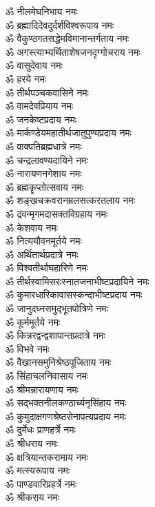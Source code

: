 \begin{multicols}{2}
\begin{flushleft}
ॐ नीलमेघनिभाय नमः\\
ॐ ब्रह्मादिदेवदुर्दर्शविश्वरूपाय नमः\\
ॐ वैकुण्ठगत\-सद्धेमविमानान्तर्गताय नमः\\
ॐ अगस्त्याभ्यर्थिताशेष\-जनदृग्गोचराय नमः\\
ॐ वासुदेवाय नमः\hfill{}\\
ॐ हरये नमः\\
ॐ तीर्थपञ्चकवासिने नमः\\
ॐ वामदेवप्रियाय नमः\\
ॐ जनकेष्टप्रदाय नमः\\
ॐ मार्कण्डेयमहातीर्थ\-जातुपुण्यप्रदाय नमः\\
ॐ वाक्पतिब्रह्मधात्रे नमः\\
ॐ चन्द्रलावण्यदायिने नमः\\
ॐ नारायणनगेशाय नमः\\
ॐ ब्रह्मकॄप्तोत्सवाय नमः\\
ॐ शङ्खचक्रवरानम्रलसत्करतलाय नमः\hfill{}\\
ॐ द्रवन्मृगमदासक्तविग्रहाय नमः\\
ॐ केशवाय नमः\\
ॐ नित्ययौवनमूर्तये नमः\\
ॐ अर्थितार्थप्रदात्रे नमः\\
ॐ विश्वतीर्थाघहारिणे नमः\\
ॐ तीर्थस्वामिसरःस्नात\-जनाभीष्टप्रदायिने नमः\\
ॐ कुमारधारिकावास\-स्कन्दाभीष्टप्रदाय नमः\\
ॐ जानुदघ्नसमुद्भूतपोत्रिणे नमः\\
ॐ कूर्ममूर्तये नमः\\
ॐ किन्नरद्वन्द्वशापान्त\-प्रदात्रे नमः\hfill{}\\
ॐ विभवे नमः\\
ॐ वैखानसमुनिश्रेष्ठपूजिताय नमः\\
ॐ सिंहाचलनिवासाय नमः\\
ॐ श्रीमन्नारायणाय नमः\\
ॐ सद्भक्तनीलकण्ठार्च्यनृसिंहाय नमः\\
ॐ कुमुदाक्षगणश्रेष्ठसेनापत्यप्रदाय नमः\\
ॐ दुर्मेधः प्राणहर्त्रे नमः\\
ॐ श्रीधराय नमः\\
ॐ क्षत्रियान्तकरामाय नमः\\
ॐ मत्स्यरूपाय नमः\hfill{}\\
ॐ पाण्डवारिप्रहर्त्रे नमः\\
ॐ श्रीकराय नमः\\

\end{flushleft}
\end{multicols}

